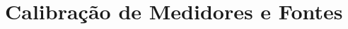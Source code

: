 \documentclass{book}
\begin{document}
\chapter{Calibração de Medidores e Fontes}



\backmatter



\end{document}
